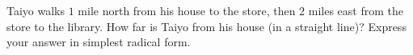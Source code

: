 Taiyo walks $1$ mile north from his house to the store, then $2$ miles east from the store to the library. How far is Taiyo from his house (in a straight line)? Express your answer in simplest radical form.
